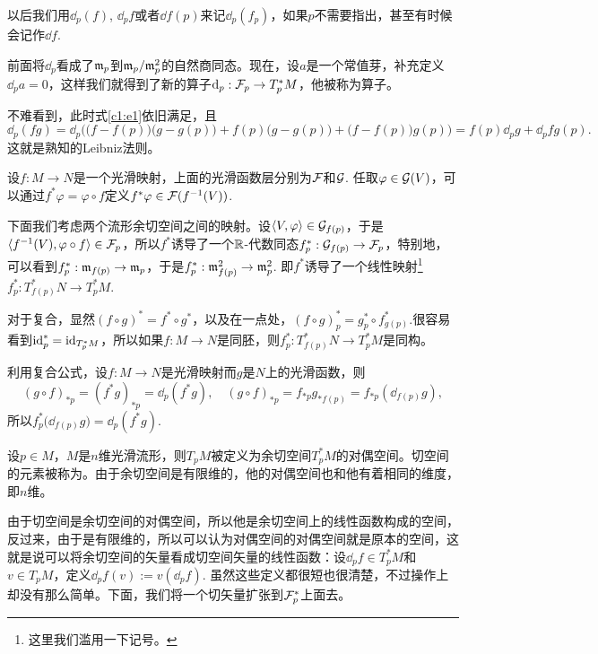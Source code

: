 以后我们用$\dd_p(f)$, $\dd_pf$或者$\dd f(p)$来记$\dd_p(f_p)$，如果$p$不需要指出，甚至有时候会记作$\dd f$. 

\begin{para}[外微分算子]
前面将$\dd_p$看成了$\mathfrak{m}_p$到$\mathfrak{m}_p/\mathfrak{m}_p^2$的自然商同态。现在，设$a$是一个常值芽，补充定义$\dd_pa=0$，这样我们就得到了新的算子$\mathrm{d}_p:\mathcal{F}_p\to T_p^*M$，他被称为算子。
\end{para}

不难看到，此时式\eqref{c1:e1}依旧满足，且
\[
\dd_p (fg)=\dd_p\bigl(\bigl(f-f(p)\bigr)\bigl(g-g(p)\bigr)+f(p)\bigl(g-g(p)\bigr)+\bigl(f-f(p)\bigr)g(p)\bigr)=f(p)\dd_pg+\dd_pf g(p).
\]
这就是熟知的Leibniz法则。

\begin{para}[拉回映射]
设$f:M\to N$是一个光滑映射，上面的光滑函数层分别为$\mathcal{F}$和$\mathcal{G}$. 任取$\varphi\in \mathcal{G}(V)$，可以通过$f^*\varphi=\varphi\circ f$定义$f^*\varphi\in \mathcal{F}(f^{-1}(V))$.

下面我们考虑两个流形余切空间之间的映射。设$\langle V,\varphi\rangle\in \mathcal{G}_{f(p)}$，于是$\langle f^{-1}(V),\varphi\circ f\rangle\in \mathcal{F}_p$，所以$f^*$诱导了一个$\mathbb{R}$-代数同态$f^*_p:\mathcal{G}_{f(p)}\to \mathcal{F}_p$，特别地，可以看到$f^*_p:\mathfrak{m}_{f(p)}\to \mathfrak{m}_{p}$，于是$f^*_p:\mathfrak{m}^2_{f(p)}\to \mathfrak{m}^2_{p}$. 即$f^*$诱导了一个线性映射\footnote{这里我们滥用一下记号。}$f^*_p:T_{f(p)}^*N\to T_p^*M$.

对于复合，显然$(f\circ g)^*=f^*\circ g^*$，以及在一点处，$(f\circ g)^*_p=g^*_p\circ f^*_{g(p)}$.很容易看到$\operatorname{id}^*_p=\operatorname{id}_{T_p^*M}$，所以如果$f:M\to N$是同胚，则$f_p^*:T_{f(p)}^*N\to T_p^*M$是同构。
\end{para}

\begin{para}\label{f*d=df*}
利用复合公式，设$f:M\to N$是光滑映射而$g$是$N$上的光滑函数，则
\[
	(g\circ f)_{*p}=(f^*g)_{*p}=\dd_p(f^*g),\quad (g\circ f)_{*p}=f_{*p}g_{*f(p)}=f_{*p}\left(\dd_{f(p)}g \right),
\]
所以$f^*_p\bigl(\dd_{f(p)}g\bigr)=\dd_{p}(f^*g)$.
\end{para}

\begin{para}
设$p\in M$，$M$是$n$维光滑流形，则$T_pM$被定义为余切空间$T_p^*M$的对偶空间。切空间的元素被称为。由于余切空间是有限维的，他的对偶空间也和他有着相同的维度，即$n$维。
\end{para}

由于切空间是余切空间的对偶空间，所以他是余切空间上的线性函数构成的空间，反过来，由于是有限维的，所以可以认为对偶空间的对偶空间就是原本的空间，这就是说可以将余切空间的矢量看成切空间矢量的线性函数：设$\dd_p f\in T_p^*M$和$v\in T_pM$，定义$\dd_p f(v):=v(\dd_p f)$. 虽然这些定义都很短也很清楚，不过操作上却没有那么简单。下面，我们将一个切矢量扩张到$\mathcal{F}_p^*$上面去。

